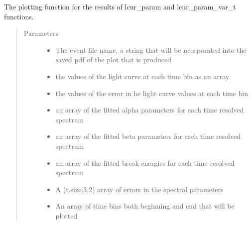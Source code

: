 \documentclass[letterpaper,10pt,english]{sphinxmanual}
\begin{document}
\begin{fulllineitems}
\label{\detokenize{read_process_files:read_process_files.lcur_param_plot}}
The plotting function for the results of lcur\_param and lcur\_param\_var\_t functions.
\begin{quote}\begin{description}
\item[{Parameters}] \leavevmode\begin{itemize}
\item {} 
 \textendash{} The event file name, a string that will be ncorporated into the saved pdf of the plot that is produced

\item {} 
 \textendash{} the values of the light curve at each time bin as an array

\item {} 
 \textendash{} the values of the error in he light curve values at each time bin

\item {} 
 \textendash{} an array of the fitted alpha parameters for each time resolved spectrum

\item {} 
 \textendash{} an array of the fitted beta parameters for each time resolved spectrum

\item {} 
 \textendash{} an array of the fitted break energies for each time resolved spectrum

\item {} 
 \textendash{} A (t.size,3,2) array of errors in the spectral parameters

\item {} 
 \textendash{} An array of time bins both beginning and end that will be plotted


\end{itemize}
\end{description}
\end{quote}
\end{fulllineitems}
\end{document}
